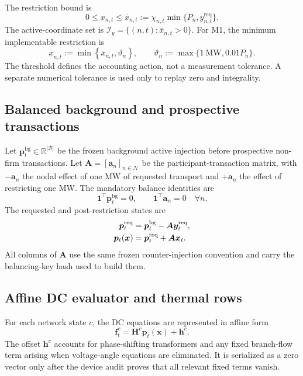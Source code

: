 \documentclass[10pt,journal,onecolumn]{IEEEtran}
\newcommand{\R}{\mathbb{R}}
\newcommand{\one}{\mathbf{1}}
\begin{document}
The restriction bound is
\begin{equation}
0\leq x_{n,t}\leq\bar x_{n,t}
:=\chi_{n,t}\min\{P_n,y^{\mathrm{req}}_{n,t}\}.
\label{eq:report_xbar}
\end{equation}
The active-coordinate set is
$\mathcal I_y=\{(n,t):\bar x_{n,t}>0\}$. For M1, the minimum implementable
restriction is
\begin{equation}
\underline x_{n,t}
:=\min\left\{\bar x_{n,t},\vartheta_n\right\},
\qquad
\vartheta_n:=\max\{1\ \mathrm{MW},0.01P_n\}.
\label{eq:report_floor}
\end{equation}
The threshold defines the accounting action, not a measurement tolerance. A
separate numerical tolerance is used only to replay zero and integrality.

\subsection{Balanced background and prospective transactions}

Let $\bm p_t^{\mathrm{bg}}\in\R^{|\mathcal B|}$ be the frozen background active
injection before prospective non-firm transactions. Let
$\bm A=[\bm a_n]_{n\in\mathcal N}$ be the participant-transaction matrix, with
$-\bm a_n$ the nodal effect of one MW of requested transport and
$+\bm a_n$ the effect of restricting one MW. The mandatory balance identities
are
\begin{equation}
\one^\top\bm p_t^{\mathrm{bg}}=0,
\qquad
\one^\top\bm a_n=0\quad\forall n.
\label{eq:report_balance}
\end{equation}
The requested and post-restriction states are
\begin{align}
\bm p_t^{\mathrm{req}}
&=\bm p_t^{\mathrm{bg}}-\bm A\bm y_t^{\mathrm{req}},
\notag\\
\bm p_t(\bm x)
&=\bm p_t^{\mathrm{req}}+\bm A\bm x_t.
\label{eq:report_states}
\end{align}
All columns of $\bm A$ use the same frozen counter-injection convention and
carry the balancing-key hash used to build them.

\subsection{Affine DC evaluator and thermal rows}

For each network state $c$, the DC equations are represented in affine form
\begin{equation}
\bm f_t^c=\bm H^c\bm p_t(\bm x)+\bm h^c.
\label{eq:report_affine}
\end{equation}
The offset $\bm h^c$ accounts for phase-shifting transformers and any fixed
branch-flow term arising when voltage-angle equations are eliminated. It is
serialized as a zero vector only after the device audit proves that all
relevant fixed terms vanish.
\end{document}
